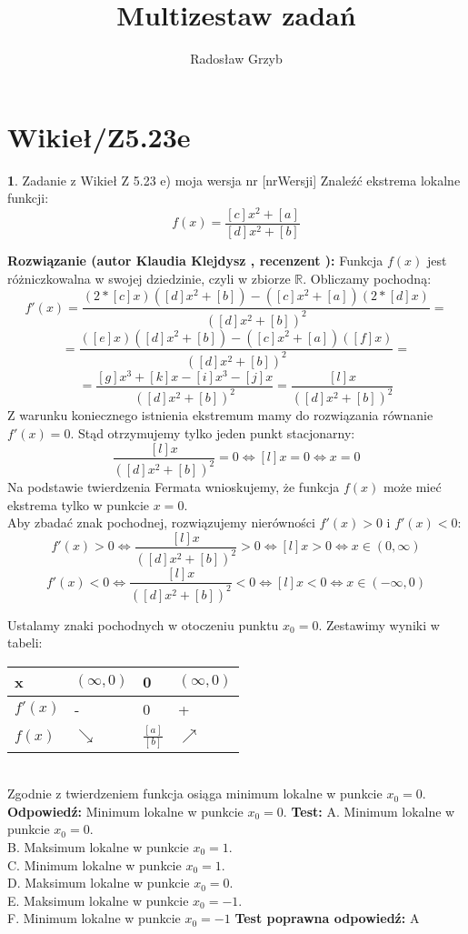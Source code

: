 \documentclass[12pt, a4paper]{article}
\title{Multizestaw zadań}
\author{Radosław Grzyb}
\date{}
\theoremstyle{definition} %
\newtheorem{zad}{}
\newcommand{\kategoria}[1]{\section{#1}} %
\newcommand{\zadStart}[1]{\begin{zad}#1\newline} %
\newcommand{\zadStop}{\end{zad}}   %
\newcommand{\rozwStart}[2]{\noindent \textbf{Rozwiązanie (autor #1 , recenzent #2): }\newline} %
\newcommand{\rozwStop}{\newline}                                            %
\newcommand{\odpStart}{\noindent \textbf{Odpowiedź:}\newline}    %
\newcommand{\odpStop}{\newline}                                             %
\newcommand{\testStart}{\noindent \textbf{Test:}\newline} %
\newcommand{\testStop}{\newline} %
\newcommand{\kluczStart}{\noindent \textbf{Test poprawna odpowiedź:}\newline} %
\newcommand{\kluczStop}{\newline} %
\begin{document}
\maketitle


\kategoria{Wikieł/Z5.23e}
\zadStart{Zadanie z Wikieł Z 5.23 e) moja wersja nr [nrWersji]}
Znaleźć ekstrema lokalne funkcji:
$$f(x)=\frac{[c]x^2+[a]}{[d]x^2+[b]}$$
\zadStop
\rozwStart{Klaudia Klejdysz}{}
Funkcja $f(x)$ jest różniczkowalna w swojej dziedzinie, czyli w zbiorze $\mathbb{R}$. Obliczamy pochodną:
$$f'(x)=\frac{(2*[c]x)([d]x^2+[b])-([c]x^2+[a])(2*[d]x)}{([d]x^2+[b])^2}=$$$$=\frac{([e]x)([d]x^2+[b])-([c]x^2+[a])([f]x)}{([d]x^2+[b])^2}=$$
$$=\frac{[g]x^3+[k]x-[i]x^3-[j]x}{([d]x^2+[b])^2}=\frac{[l]x}{([d]x^2+[b])^2}$$
\noindent Z warunku koniecznego istnienia ekstremum mamy do rozwiązania równanie $f'(x)=0$. Stąd otrzymujemy tylko jeden punkt stacjonarny:
$$\frac{[l]x}{([d]x^2+[b])^2}=0\Leftrightarrow[l]x=0\Leftrightarrow x=0$$
Na podstawie twierdzenia Fermata wnioskujemy, że funkcja $f(x)$ może mieć ekstrema tylko w punkcie $x=0$.\\
Aby zbadać znak pochodnej, rozwiązujemy nierówności $f'(x)>0$ i $f'(x)<0$:
$$f'(x)>0\Leftrightarrow\frac{[l]x}{([d]x^2+[b])^2}>0\Leftrightarrow [l]x>0\Leftrightarrow x\in(0,\infty)$$
$$f'(x)<0\Leftrightarrow\frac{[l]x}{([d]x^2+[b])^2}<0\Leftrightarrow [l]x<0\Leftrightarrow x\in(-\infty,0)$$

\noindent Ustalamy znaki pochodnych w otoczeniu punktu $x_0=0$. Zestawimy wyniki w tabeli:
\begin{table}[h!]
\centering
\begin{tabular}{|l|l|l|l|}
\hline
x     & $(\infty,0)$ & 0 & $(\infty,0)$ \\ \hline
$f'(x)$ & -                          & 0 & +                         \\ \hline
$f(x)$  & $\searrow$    & $\frac{[a]}{[b]}$ & $\nearrow$   \\ \hline
\end{tabular}
\end{table}\\
Zgodnie z twierdzeniem funkcja osiąga minimum lokalne w punkcie $x_0=0$.
\rozwStop
\odpStart
Minimum lokalne w punkcie $x_0=0$.
\odpStop
\testStart
A. Minimum lokalne w punkcie $x_0=0$.\\
B. Maksimum lokalne w punkcie $x_0=1$.\\
C. Minimum lokalne w punkcie $x_0=1$.\\
D. Maksimum lokalne w punkcie $x_0=0$.\\
E. Maksimum lokalne w punkcie $x_0=-1$.\\
F. Minimum lokalne w punkcie $x_0=-1$
\testStop
\kluczStart
A
\kluczStop
\end{document}
